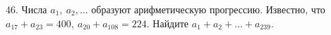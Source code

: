 46. Числа $a_1,\ a_2,\ldots$ образуют арифметическую прогрессию. Известно, что $a_{17}+a_{23}=400,\ a_{20}+a_{108}=224.$ Найдите $a_{1}+a_2+\ldots+a_{239}.$\\
